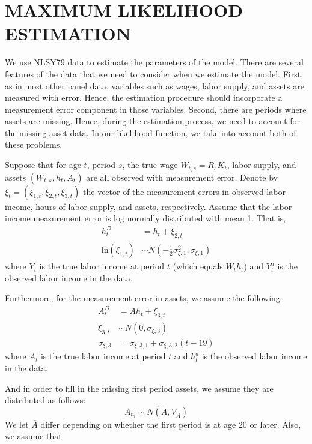 \documentclass{article}
\begin{document}
\section{MAXIMUM LIKELIHOOD ESTIMATION}
\label{section:MLE}
We use NLSY79 data to estimate the parameters of the model. There are several features of the data that we need to consider when we estimate the model. First, as in most other panel data, variables such as wages, labor supply, and assets are measured with error. Hence, the estimation procedure should incorporate a measurement error component in those variables. Second, there are periods where assets are missing. Hence, during the estimation process, we need to account for the missing asset data. In our likelihood function, we take into account both of these problems.\par
Suppose that for age $t$, period $s$, the true wage $W_{t,s} = R_s K_t$, labor supply, and assets $(W_{t,s}, h_t, A_t)$ are all observed with measurement error. Denote by $\xi_t = (\xi_{1,t}, \xi_{2,t}, \xi_{3,t})$ the vector of the measurement errors in observed labor income, hours of labor supply, and assets, respectively. Assume that the labor income measurement error is log normally distributed with mean 1. That is,
\begin{equation*}
  \begin{split}
    h_t^D &= h_t + \xi_{2,t}\\
    \text{ln}(\xi_{1,t}) & \sim N(-\frac{1}{2} \sigma_{\xi,1}^2,\sigma_{\xi,1})
    \end{split}
  \end{equation*}
  where $Y_t$ is the true labor income at period $t$ (which equals $W_th_t$) and $Y_t^d$ is the observed labor income in the data. \par
  Furthermore, for the measurement error in assets, we assume the following:
  \begin{equation*}
  \begin{split}
    A_t^D &= Ah_t + \xi_{3,t}\\
    \xi_{3,t} & \sim N(0,\sigma_{\xi,3})\\
    \sigma_{\xi,3}& = \sigma_{\xi,3,1}+\sigma_{\xi,3,2}(t-19)
    \end{split}
  \end{equation*}
  where $A_t$ is the true labor income at period $t$ and $h_t^d$ is the observed labor income in the data. \par
  And in order to fill in the missing first period assets, we assume they are distributed as follows:
  \begin{equation*}
    A_{t_0} \sim N(\bar{A},V_{\bar{A}})
    \end{equation*}
    We let $\bar{A}$ differ depending on whether the first period is at age 20 or later. Also, we assume that
    
\end{document}
